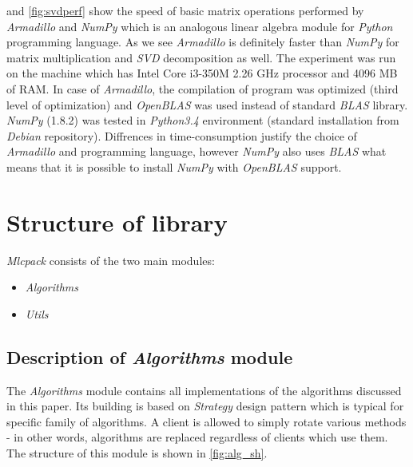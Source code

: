  and \cref{fig:svdperf} show the speed of basic matrix operations performed by \textit{Armadillo} and \textit{NumPy} which is an analogous linear algebra module for \textit{Python} programming language. As we see \textit{Armadillo} is definitely faster than \textit{NumPy} for matrix multiplication and \textit{SVD} decomposition as well.   
The experiment was run on the machine which has Intel Core i3-350M 2.26 GHz processor and 4096 MB of RAM. In case of \textit{Armadillo}, the compilation of program was optimized (third level of optimization) and \textit{OpenBLAS} was used instead of standard \textit{BLAS} library. \textit{NumPy} (1.8.2) was tested in \textit{Python3.4} environment (standard installation from \textit{Debian} repository). Diffrences in time-consumption justify the choice of \textit{Armadillo} and  programming language, however \textit{NumPy} also uses \textit{BLAS} what means that it is possible to install \textit{NumPy} with \textit{OpenBLAS} support.

\section{Structure of library}

\textit{Mlcpack} consists of the two main modules:
\begin{itemize}
    \item \textit{Algorithms}
    \item \textit{Utils}
\end{itemize}

\subsection{Description of \textit{Algorithms} module}

The \textit{Algorithms} module contains all implementations of the algorithms discussed in this paper. Its building is based on \textit{Strategy} design pattern which is typical for specific family of algorithms. A client is allowed to simply rotate various methods - in other words, algorithms are replaced regardless of clients which use them. The structure of this module is shown in \cref{fig:alg_sh}. 

